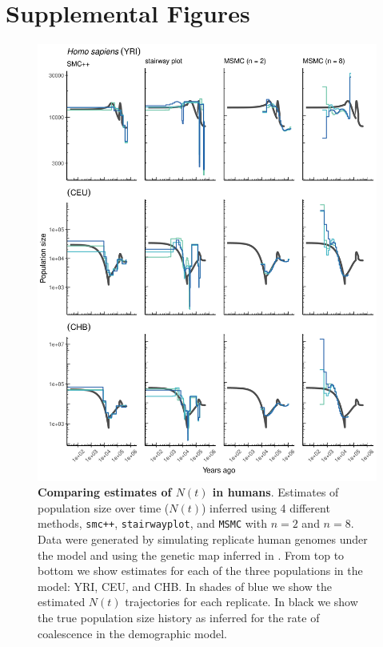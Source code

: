 \documentclass[12pt,halfline,a4paper]{ouparticle}
\newcommand{\beginsupplement}{%
        \setcounter{table}{0}
        \renewcommand{\thetable}{S\arabic{table}}%
        \setcounter{figure}{0}
        \renewcommand{\thefigure}{S\arabic{figure}}%
     }
\newcommand{\MSMC}{\texttt{MSMC}\xspace}
\newcommand{\smcpp}{\texttt{smc++}\xspace}
\newcommand{\stairwayplot}{\texttt{stairwayplot}\xspace}
\begin{document}



\pagebreak
\beginsupplement
\section*{Supplemental Figures}
\begin{figure}
\begin{center}
\includegraphics[width=0.8\linewidth]{display_items/homo_sapiens_mask_Gutenkunst.png}
\caption{\textbf{Comparing estimates of $N(t)$ in humans}. Estimates of population
size over time ($N(t)$) inferred using 4 different methods, \smcpp, \stairwayplot, and
\MSMC with $n=2$ and $n=8$. Data were generated by simulating
replicate human genomes under the \cite{gutenkunst2009inferring} model and using the genetic map
inferred in \cite{international2007second}. From top to bottom we show estimates for each
of the three populations in the model: YRI, CEU, and CHB. In shades of blue we show the estimated
$N(t)$ trajectories for each replicate. In black we show the true population size history as inferred
for the rate of coalescence in the demographic model.}
\label{fig:n_t_gutenkunst}
\end{center}
\end{figure}
\end{document}

